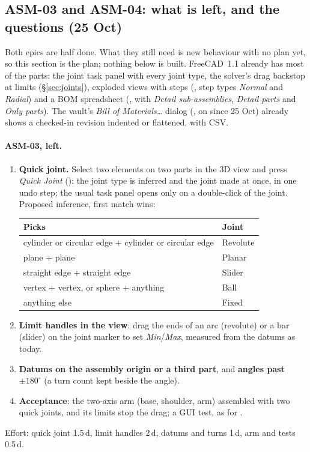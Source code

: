 \subsection{ASM-03 and ASM-04: what is left, and the questions (25 Oct)}\label{sec:asm0304-plan}

Both epics are half done. What they still need is new behaviour with no plan yet, so this section is the plan;
nothing below is built. FreeCAD~1.1 already has most of the parts: the joint task panel with every joint type,
the solver's drag backstop at limits (\S\ref{sec:joints}), exploded views with steps (,
step types \emph{Normal} and \emph{Radial}) and a BOM spreadsheet (, with \emph{Detail
sub-assemblies}, \emph{Detail parts} and \emph{Only parts}). The vault's \emph{Bill of Materials\ldots} dialog
(, on since 25 Oct) already shows a checked-in revision indented or flattened, with CSV.

\paragraph{ASM-03, left.}
\begin{enumerate}[nosep]
  \item \textbf{Quick joint.} Select two elements on two parts in the 3D view and press \emph{Quick Joint}
        (): the joint type is inferred and the joint made at once, in one undo step; the usual task panel
        opens only on a double-click of the joint. Proposed inference, first match wins:
        \begin{center}\small
        \begin{tabular}{@{}ll@{}}
        \toprule
        Picks & Joint\\
        \midrule
        cylinder or circular edge + cylinder or circular edge & Revolute\\
        plane + plane & Planar\\
        straight edge + straight edge & Slider\\
        vertex + vertex, or sphere + anything & Ball\\
        anything else & Fixed\\
        \bottomrule
        \end{tabular}
        \end{center}
  \item \textbf{Limit handles in the view}: drag the ends of an arc (revolute) or a bar (slider) on the joint marker
        to set \emph{Min}/\emph{Max}, measured from the datums as today.
  \item \textbf{Datums on the assembly origin or a third part}, and \textbf{angles past $\pm180^\circ$} (a turn count
        kept beside the angle).
  \item \textbf{Acceptance}: the two-axis arm (base, shoulder, arm) assembled with two quick joints, and its limits
        stop the drag; a GUI test, as for .
\end{enumerate}
Effort: quick joint 1.5\,d, limit handles 2\,d, datums and turns 1\,d, arm and tests 0.5\,d.

